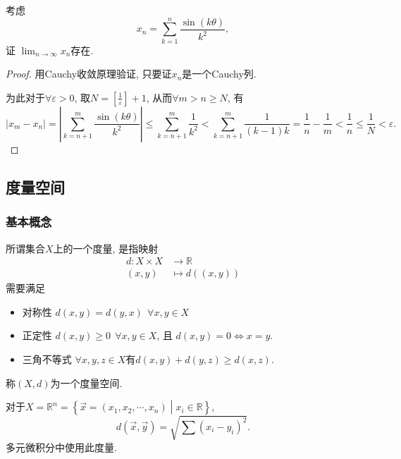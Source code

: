 \begin{example}[来自以后极限收敛的例子]
    考虑
    \begin{equation}
      x_n = \sum_{k=1}^{n} \frac{\sin (k\theta)}{k^{2}},
    \end{equation}
    证 $\displaystyle \lim_{n \to \infty} x_n$存在.
\end{example}
\begin{proof}
    用Cauchy收敛原理验证, 只要证$x_n$是一个Cauchy列.

    为此对于$\forall \varepsilon > 0 $, 取$N = \left[ \frac{1}{\varepsilon} \right] +1 $, 从而$\forall m>n\ge N$, 有
    \begin{equation}
      \left| x_m - x_n \right| = \left| \sum_{k=n+1}^{m} \frac{\sin(k\theta)}{k^{2}} \right| \le \sum_{k= n+1}^{m} \frac{1}{k^{2}} < \sum_{k= n+1}^{m} \frac{1}{(k-1)k} = \frac{1}{n} - \frac{1}{m} < \frac{1}{n} \le \frac{1}{N} < \varepsilon. 
    \end{equation}
\end{proof}

\subsection{度量空间}
\subsubsection{基本概念}
\begin{definition}
    所谓集合$X$上的一个度量, 是指映射
    \begin{equation}
        \begin{aligned}
            d\colon X \times X &\longrightarrow \mathbb{R} \\
                     (x,y) &\longmapsto d((x,y))
        \end{aligned}
    \end{equation}
    需要满足
    \begin{itemize}
        \item 对称性 $d(x,y) = d(y,x) \ \ \forall x,y \in X$
        \item 正定性 $d(x,y) \ge 0 \ \ \forall x,y \in X$, 且 $d(x,y) = 0 \iff x=y$.
        \item 三角不等式 $\forall x,y,z \in X$有$d(x,y) + d(y,z) \ge d(x,z)$.
    \end{itemize}
    称$\left( X,d \right) $为一个度量空间.
\end{definition}
\begin{example}
    对于$X = \mathbb{R}^{n} = \left\{ \vec{x} = (x_1,x_2,\cdots,x_n) \middle| x_i \in \mathbb{R} \right\} $, 
    \begin{equation}
      d(\vec{x}, \vec{y}) = \sqrt{\sum \left( x_i - y_i \right) ^{2}}.
    \end{equation}
    多元微积分中使用此度量.
\end{example}

